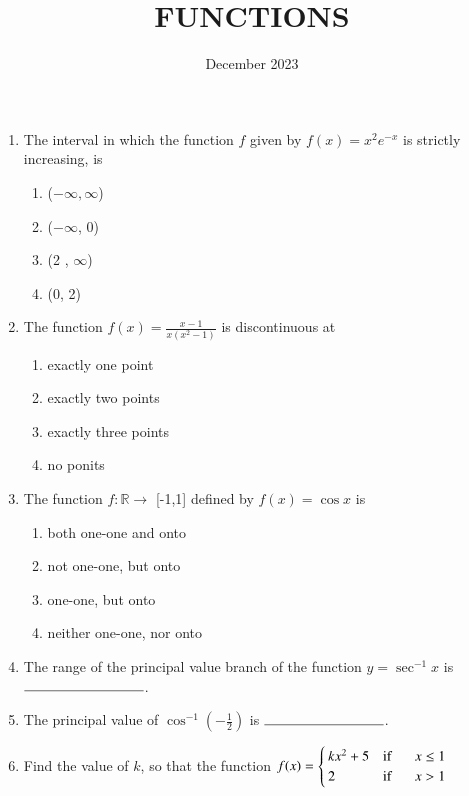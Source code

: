 \documentclass[12pt,-letter paper]{article}
\title{FUNCTIONS}                    \date{December 2023}
\begin{document}
                     \maketitle                           \begin{enumerate}
\item The interval in which the function $f$ given by $f(x)=x^{2}e^{-x}$ is strictly\\ increasing, is         
\begin{enumerate}                    \item($-\infty, \infty$)             \item($-\infty$, 0)                  \item(2 , $\infty$)                  \item(0, 2)
\end{enumerate}                      \item The function $f(x)=\frac{x-1} {x(x^2-1)}$ is discontinuous at       \begin{enumerate}
\item exactly one point              \item exactly two points             \item exactly three points           \item no ponits                      \end{enumerate}                      \item The function $f:\mathbb{R}\to$ [-1,1] defined by $f(x)=\cos{x}$ is
\begin{enumerate}                    \item both one-one and onto
\item not one-one, but onto
\item one-one, but onto               \item neither one-one, nor onto
\end{enumerate}
\item The range of the principal value branch of the function $y= \sec^{-1}x$ is $\rule{3cm}{0.15mm}$.         \item The principal value of $\cos^{-1} \left(-\frac{1}{2}\right)$ is $\rule{3cm}{0.15mm}$.
\item Find the value of $k$, so that the function $f(x) =\begin{cases}kx^{2}+ 5 & \text{if } \hspace{0.5cm} x \leq1 \\ 2 & \text{if } \hspace{0.5cm} x > 1\end{cases}$

\end{enumerate}
\end{document}
